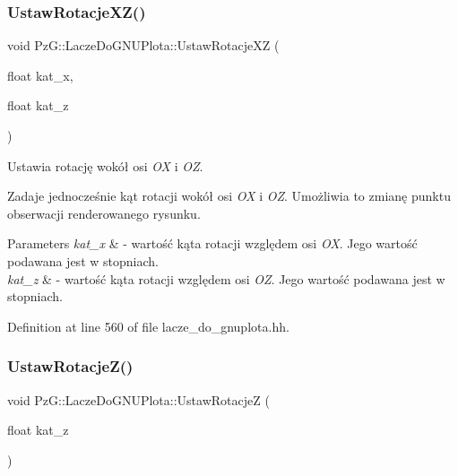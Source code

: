 \subsubsection{\texorpdfstring{Ustaw\+Rotacje\+X\+Z()}{UstawRotacjeXZ()}}
{\footnotesize\ttfamily void Pz\+G\+::\+Lacze\+Do\+G\+N\+U\+Plota\+::\+Ustaw\+Rotacje\+XZ (\begin{DoxyParamCaption}\item[{float}]{kat\+\_\+x,  }\item[{float}]{kat\+\_\+z }\end{DoxyParamCaption})\hspace{0.3cm}{\ttfamily [inline]}}



Ustawia rotację wokół osi {\itshape OX} i {\itshape OZ}. 

Zadaje jednocześnie kąt rotacji wokół osi {\itshape OX} i {\itshape OZ}. Umożliwia to zmianę punktu obserwacji renderowanego rysunku. 
\begin{DoxyParams}{Parameters}
{\em kat\+\_\+x} & -\/ wartość kąta rotacji względem osi {\itshape OX}. Jego wartość podawana jest w stopniach. \\
\hline
{\em kat\+\_\+z} & -\/ wartość kąta rotacji względem osi {\itshape OZ}. Jego wartość podawana jest w stopniach. \\
\hline
\end{DoxyParams}


Definition at line 560 of file lacze\+\_\+do\+\_\+gnuplota.\+hh.

\mbox{\label{class_pz_g_1_1_lacze_do_g_n_u_plota_a458399aa2a8f4b3f00ccd5b272857ea1}} 
\subsubsection{\texorpdfstring{Ustaw\+Rotacje\+Z()}{UstawRotacjeZ()}}
{\footnotesize\ttfamily void Pz\+G\+::\+Lacze\+Do\+G\+N\+U\+Plota\+::\+Ustaw\+RotacjeZ (\begin{DoxyParamCaption}\item[{float}]{kat\+\_\+z }\end{DoxyParamCaption})\hspace{0.3cm}{\ttfamily [inline]}}



